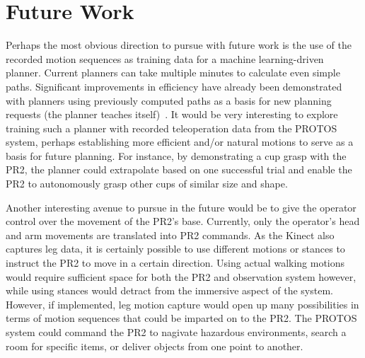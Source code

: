 \documentclass{sig-alternate}
\begin{document}
\section{Future Work}
\label{sec:future_work} Perhaps the most obvious direction to pursue with
future work is the use of the recorded motion sequences as training data
for a machine learning-driven planner. Current planners can take multiple 
minutes to calculate even simple paths. Significant improvements in efficiency have 
already been demonstrated with planners using previously computed paths as a 
basis for new planning requests (the planner teaches itself)~\cite{mit_planning}. It would be
very interesting to explore training such a planner with recorded teleoperation
data from the PROTOS system, perhaps establishing more efficient and/or natural motions to serve as
a basis for future planning. For instance, by demonstrating a cup grasp with the PR2, the planner
could extrapolate based on one successful trial and enable the PR2 to autonomously grasp other cups
of similar size and shape.

\indent Another interesting avenue to pursue in the future would be to give the 
operator control over the movement of the PR2's base. Currently, only
the operator's head and arm movements are translated into PR2 commands. As the
Kinect also captures leg data, it is certainly possible to use different
motions or stances to instruct the PR2 to move in a certain direction.
Using actual walking motions would require sufficient space for both the PR2
and observation system however, while 
using stances would detract from the immersive aspect of the system. However,
if implemented, leg motion capture would open up many possibilities in terms of
motion sequences that could be imparted on to the PR2. The PROTOS system could 
command the PR2 to
nagivate hazardous environments, search a room for specific items, or deliver
objects from one point to another.
\end{document}
